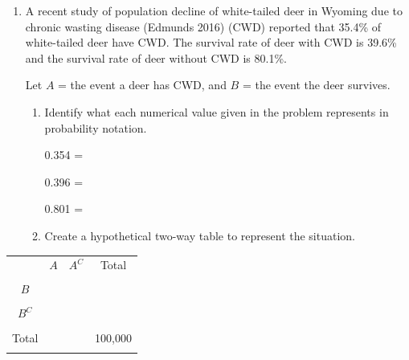 \documentclass[
]{report}
\begin{document}
\vspace{0.55in}

\newpage

\begin{enumerate}
\def\labelenumi{\arabic{enumi}.}
\setcounter{enumi}{1}
\item
  A recent study of population decline of white-tailed deer in Wyoming due to chronic wasting disease (Edmunds 2016) (CWD) reported that 35.4\% of white-tailed deer have CWD. The survival rate of deer with CWD is 39.6\% and the survival rate of deer without CWD is 80.1\%.\\
  \vspace{1mm}

  Let \(A\) = the event a deer has CWD, and \(B\) = the event the deer survives.
  \vspace{0.1in}

  \begin{enumerate}
  \def\labelenumii{\alph{enumii}.}
  \item
    Identify what each numerical value given in the problem represents in probability notation.
    \vspace{.1in}

    0.354 =\\
    \vspace{.1in}

    0.396 =\\
    \vspace{.1in}

    0.801 =\\
    \vspace{.1in}
  \item
    Create a hypothetical two-way table to represent the situation.
  \end{enumerate}
\end{enumerate}

\begin{center}
\begin{tabular}{|c|c|c|c|} \hline
\hspace{0.8in} & \hspace{0.35in} $A$ \hspace{.35in} & \hspace{0.35in} $A^C$  \hspace{0.35in} & \hspace{0.3in} Total \hspace{0.3in} \\ 
& & & \\ \hline
$B$& & & \\ 
& & & \\ \hline
$B^C$& & & \\ 
& & & \\ \hline
Total & & & 100,000 \\ 
& & & \\ \hline
\end{tabular}
\end{center}
\vspace{.1in}
\end{document}
